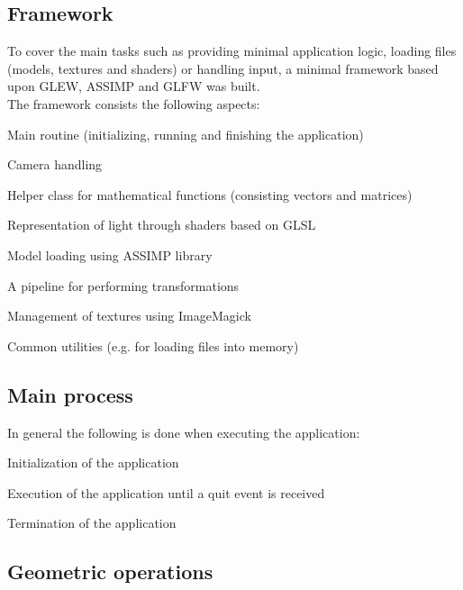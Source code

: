 \documentclass[pdftex,12pt,a4paper]{article}
\begin{document}
\subsection{Framework}

To cover the main tasks such as providing minimal application logic, loading files (models, textures and shaders) or handling input, a minimal framework based upon \gls{GLEW}, \gls{ASSIMP} and \gls{GLFW} was built.\\
\newpage
The framework consists the following aspects:
\begin{compactitem}
	\item Main routine (initializing, running and finishing the application)
	\item Camera handling
	\item Helper class for mathematical functions (consisting vectors and matrices)
	\item Representation of light through shaders based on GLSL
	\item Model loading using ASSIMP library
	\item A pipeline for performing transformations
	\item Management of textures using \gls{ImageMagick}
	\item Common utilities (e.g. for loading files into memory)
\end{compactitem}

\subsection{Main process}

In general the following is done when executing the application:
\begin{compactitem}
	\item Initialization of the application
	\item Execution of the application until a quit event is received
	\item Termination of the application
\end{compactitem}

\subsection{Geometric operations}
\end{document}
